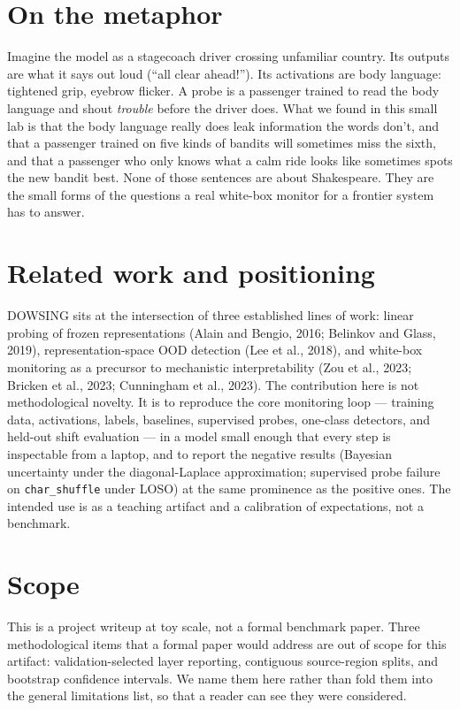\documentclass[11pt]{article}
\begin{document}
\section{On the metaphor}

Imagine the model as a stagecoach driver crossing unfamiliar country. Its outputs are what it says out loud (``all clear ahead!''). Its activations are body language: tightened grip, eyebrow flicker. A probe is a passenger trained to read the body language and shout \emph{trouble} before the driver does. What we found in this small lab is that the body language really does leak information the words don't, and that a passenger trained on five kinds of bandits will sometimes miss the sixth, and that a passenger who only knows what a calm ride looks like sometimes spots the new bandit best. None of those sentences are about Shakespeare. They are the small forms of the questions a real white-box monitor for a frontier system has to answer.

\section{Related work and positioning}

DOWSING sits at the intersection of three established lines of work: linear probing of frozen representations (Alain and Bengio, 2016; Belinkov and Glass, 2019), representation-space OOD detection (Lee et al., 2018), and white-box monitoring as a precursor to mechanistic interpretability (Zou et al., 2023; Bricken et al., 2023; Cunningham et al., 2023). The contribution here is not methodological novelty. It is to reproduce the core monitoring loop --- training data, activations, labels, baselines, supervised probes, one-class detectors, and held-out shift evaluation --- in a model small enough that every step is inspectable from a laptop, and to report the negative results (Bayesian uncertainty under the diagonal-Laplace approximation; supervised probe failure on \texttt{char\_shuffle} under LOSO) at the same prominence as the positive ones. The intended use is as a teaching artifact and a calibration of expectations, not a benchmark.

\section{Scope}\label{sec:scope}

This is a project writeup at toy scale, not a formal benchmark paper. Three methodological items that a formal paper would address are out of scope for this artifact: validation-selected layer reporting, contiguous source-region splits, and bootstrap confidence intervals. We name them here rather than fold them into the general limitations list, so that a reader can see they were considered.
\end{document}
